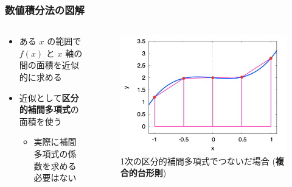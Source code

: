 \documentclass[dvipdfmx,aspectratio=169,20pt]{beamer}
\newcommand{\myfontsetting}[3]{{\fontsize{#1}{#2}\selectfont #3}}
\begin{document}
\date[\todey]{}

\frame{\titlepage}

\begin{frame}
\frametitle{\myfontsetting{28pt}{28pt}{数値積分法の図解}}
\begin{columns}[t]
\begin{column}{0.55\textwidth} 
\vspace{-5mm}
\begin{itemize}
    \setlength{\itemsep}{0.25cm}
    \item 
    \myfontsetting{15pt}{17pt}{
    ある $x$ の範囲で $f(x)$ と $x$ 軸の間の面積を近似的に求める
    }
    \item 
    \myfontsetting{15pt}{17pt}{
    近似として{\bf 区分的補間多項式}の面積を使う
    }
    \begin{itemize}
        \item 
        \myfontsetting{12pt}{12pt}{実際に補間多項式の係数を求める必要はない
        }
    \end{itemize}
\end{itemize}
\end{column}
\begin{column}{0.45\textwidth} 
\begin{figure}[h]
	\begin{center}
\vspace{-10mm}
    	\includegraphics[width=1.0\textwidth]{fig11-1_trapezoid_rule_N4.png}
	\end{center}
	\vspace{-9mm}
	\caption{\myfontsetting{10pt}{10pt}{1次の区分的補間多項式でつないだ場合 ({\bf 複合的台形則})}}
\end{figure}
\end{column}
\end{columns}
\end{frame}
\end{document}
